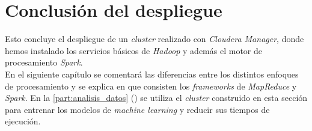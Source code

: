 \section*{Conclusión del despliegue}

Esto concluye el despliegue de un \textit{cluster} realizado con \textit{Cloudera Manager}, donde hemos instalado los
servicios básicos de \textit{Hadoop} y además el motor de procesamiento \textit{Spark}.\\
En el siguiente capítulo se comentará las diferencias entre los distintos enfoques de procesamiento y se
explica en que consisten los \textit{frameworks} de \textit{MapReduce} y \textit{Spark}.
En la \autoref{part:analisis_datos} () se utiliza el \textit{cluster} construido 
en esta sección para entrenar los modelos de \textit{machine learning} y reducir sus tiempos de ejecución.

\clearpage
